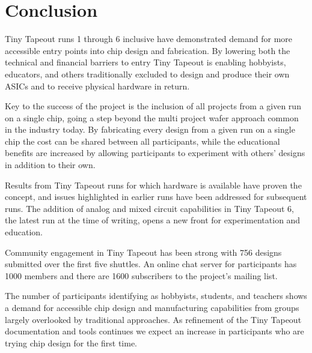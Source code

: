 \section{Conclusion}
\label{sec:conclusion}

Tiny Tapeout runs 1 through 6 inclusive have demonstrated demand for more accessible entry points into chip design and fabrication. By lowering both the technical and financial barriers to entry Tiny Tapeout is enabling hobbyists, educators, and others traditionally excluded to design and produce their own ASICs and to receive physical hardware in return.

Key to the success of the project is the inclusion of all projects from a given run on a single chip, going a step beyond the multi project wafer approach common in the industry today. By fabricating every design from a given run on a single chip the cost can be shared between all participants, while the educational benefits are increased by allowing participants to experiment with others' designs in addition to their own.

Results from Tiny Tapeout runs for which hardware is available have proven the concept, and issues highlighted in earlier runs have been addressed for subsequent runs. The addition of analog and mixed circuit capabilities in Tiny Tapeout 6, the latest run at the time of writing, opens a new front for experimentation and education.

Community engagement in Tiny Tapeout has been strong with 756 designs submitted over the first five shuttles. An online chat server for participants has 1000 members and there are 1600 subscribers to the project's mailing list.

The number of participants identifying as hobbyists, students, and teachers shows a demand for accessible chip design and manufacturing capabilities from groups largely overlooked by traditional approaches. As refinement of the Tiny Tapeout documentation and tools continues we expect an increase in participants who are trying chip design for the first time.
